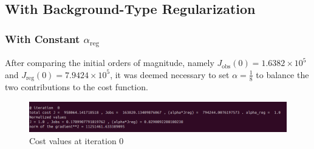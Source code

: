 \documentclass{article}
\begin{document}
\subsection{With Background-Type Regularization}
\subsubsection{With Constant \( \alpha_{\text{reg}} \)}
After comparing the initial orders of magnitude, namely \( J_{\text{obs}}(0) = 1.6382 \times 10^5 \) and \( J_{\text{reg}}(0) = 7.9424 \times 10^5 \), it was deemed necessary to set \( \alpha = \frac{1}{8} \) to balance the two contributions to the cost function.

\begin{figure}[H]
    \centering
    \includegraphics[width=0.8\linewidth]{Images_Ayoub/With_Regularisation/Alpha_Const/Pasted image.png}
    \caption{Cost values at iteration 0}
    \label{fig:enter-label}
\end{figure}
\end{document}
